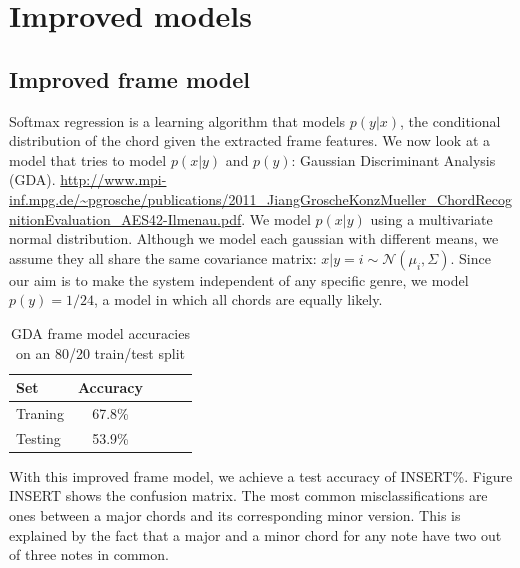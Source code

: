 \documentclass{article}
\begin{document}
\section{Improved models}
\subsection{Improved frame model}

Softmax regression is a learning algorithm that models $p(y|x)$, the conditional distribution of the chord given the extracted frame features. We now look at a model that tries to model $p(x|y)$ and $p(y)$: Gaussian Discriminant Analysis (GDA). \url{http://www.mpi-inf.mpg.de/~pgrosche/publications/2011_JiangGroscheKonzMueller_ChordRecognitionEvaluation_AES42-Ilmenau.pdf}. We model $p(x|y)$ using a multivariate normal distribution. Although we model each gaussian with different means, we assume they all share the same covariance matrix: $x|y=i \sim \mathcal{N}$$(\mu_i, \Sigma)$. Since our aim is to make the system independent of any specific genre, we model $p(y) = 1/24$, a model in which all chords are equally likely. 
\begin{table}[t]
\caption{GDA frame model accuracies on an 80/20 train/test split}
\label{mfccvschroma}
\vskip 0.15in
\begin{center}
\begin{small}
\begin{sc}
\begin{tabular}{lcccr}
\hline
\abovespace\belowspace
Set & Accuracy \\
\hline
\abovespace
Traning    & 67.8\%\\
Testing & 53.9\%\\
\hline
\end{tabular}
\end{sc}
\end{small}
\end{center}
\vskip -0.1in
\end{table}

With this improved frame model, we achieve a test accuracy of INSERT\%. Figure INSERT shows the confusion matrix. The most common misclassifications are ones between a major chords and its corresponding minor version. This is explained by the fact that a major and a minor chord for any note have two out of three notes in common. 
\end{document}
